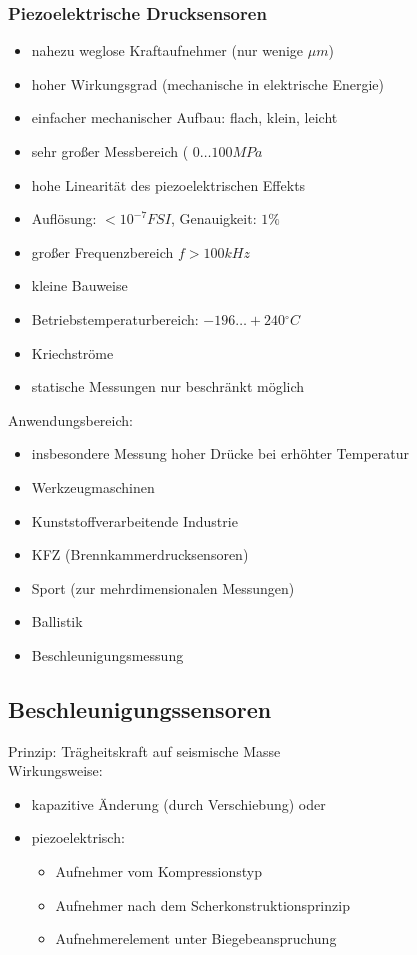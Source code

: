 \documentclass{scrreprt}
\begin{document}
\subsubsection*{Piezoelektrische Drucksensoren}
\begin{itemize}[label=$+$]
\item nahezu weglose Kraftaufnehmer (nur wenige $\unit{\mu m}$)
\item hoher Wirkungsgrad (mechanische in elektrische Energie)
\item einfacher mechanischer Aufbau: flach, klein, leicht
\item sehr großer Messbereich ( $0 \ldots 100 \unit{MPa}$
\item hohe Linearität des piezoelektrischen Effekts
\item Auflösung: $< 10^{-7} \unit{FSI}$, Genauigkeit: $1\%$
\item großer Frequenzbereich $f > 100 \unit{kHz}$
\item kleine Bauweise
\item Betriebstemperaturbereich: $-196 \ldots + 240 \unit{^\circ C}$
\end{itemize}
\begin{itemize}[label=$-$]
\item Kriechströme
\item statische Messungen nur beschränkt möglich
\end{itemize}
Anwendungsbereich:
\begin{itemize}
\item insbesondere Messung hoher Drücke bei erhöhter Temperatur
\item Werkzeugmaschinen
\item Kunststoffverarbeitende Industrie
\item KFZ (Brennkammerdrucksensoren)
\item Sport (zur mehrdimensionalen Messungen)
\item Ballistik
\item Beschleunigungsmessung
\end{itemize}

\subsection{Beschleunigungssensoren}
Prinzip: Trägheitskraft auf seismische Masse\\
Wirkungsweise:
\begin{itemize}
\item kapazitive Änderung (durch Verschiebung) oder
\item piezoelektrisch:
\begin{itemize}
\item Aufnehmer vom Kompressionstyp
\item Aufnehmer nach dem Scherkonstruktionsprinzip
\item Aufnehmerelement unter Biegebeanspruchung
\end{itemize}
\end{itemize}
\end{document}
